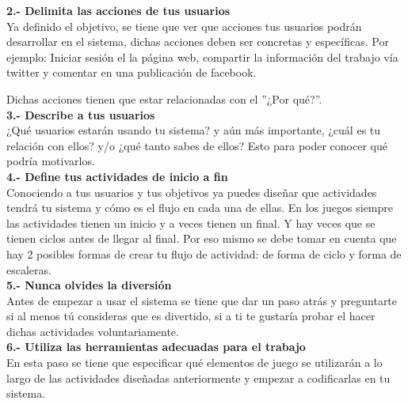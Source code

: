     \noindent \textbf{2.- Delimita las acciones de tus usuarios}\\
    
    \noindent Ya definido el objetivo, se tiene que ver que acciones tus usuarios podrán desarrollar en el sistema, dichas acciones deben ser concretas y específicas. Por ejemplo: Iniciar sesión el la página web, compartir la información del trabajo vía twitter y comentar en una publicación de facebook. 
    
    \noindent Dichas acciones tienen que estar relacionadas con el ''¿Por qué?''.\\
    
    \noindent \textbf{3.- Describe a tus usuarios}\\
    
    \noindent ¿Qué usuarios estarán usando tu sistema? y aún más importante, ¿cuál es tu relación con ellos? y/o ¿qué tanto sabes de ellos? Esto para poder conocer qué podría motivarlos.\\
    
    
    \noindent \textbf{4.- Define tus actividades de inicio a fin}\\
    
    \noindent Conociendo a tus usuarios y tus objetivos ya puedes diseñar que actividades tendrá tu sistema y cómo es el flujo en cada una de ellas. En los juegos siempre las actividades tienen un inicio y a veces tienen un final. Y hay veces que se tienen ciclos antes de llegar al final. Por eso mismo se debe tomar en cuenta que hay 2 posibles formas de crear tu flujo de actividad: de forma de ciclo y forma de escaleras.\\
    
    
    
    
    \noindent \textbf{5.- Nunca olvides la diversión}\\
    
    \noindent Antes de empezar a usar el sistema se tiene que dar un paso atrás y preguntarte si al menos tú consideras que es divertido, si a ti te gustaría probar el hacer dichas actividades voluntariamente.\\
    
    
    \noindent \textbf{6.- Utiliza las herramientas adecuadas para el trabajo}\\
    
    \noindent En esta paso se tiene que especificar qué elementos de juego se utilizarán a lo largo de las actividades diseñadas anteriormente y empezar a codificarlas en tu sistema.\\
    
